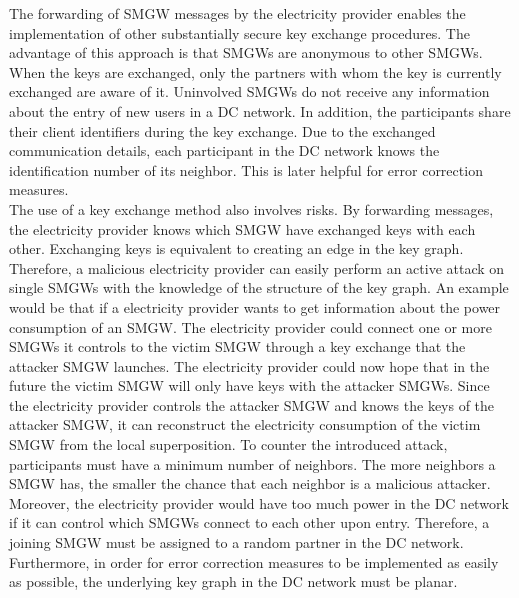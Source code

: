 The forwarding of SMGW messages by the electricity provider enables the implementation of other substantially secure key exchange procedures. The advantage of this approach is that SMGWs are anonymous to other SMGWs. When the keys are exchanged, only the partners with whom the key is currently exchanged are aware of it. Uninvolved SMGWs do not receive any information about the entry of new users in a DC network. In addition, the participants share their client identifiers during the key exchange. Due to the exchanged communication details, each participant in the DC network knows the identification number of its neighbor. This is later helpful for error correction measures. %
\\The use of a key exchange method also involves risks. By forwarding messages, the electricity provider knows which SMGW have exchanged keys with each other. Exchanging keys is equivalent to creating an edge in the key graph.%
Therefore, a malicious electricity provider can easily perform an active attack on single SMGWs with the knowledge of the structure of the key graph.%
An example would be that if a electricity provider wants to get information about the power consumption of an SMGW. The electricity provider could connect one or more SMGWs it controls to the victim SMGW through a key exchange that the attacker SMGW launches. The electricity provider could now hope that in the future the victim SMGW will only have keys with the attacker SMGWs. Since the electricity provider controls the attacker SMGW and knows the keys of the attacker SMGW, it can reconstruct the electricity consumption of the victim SMGW from the local superposition. To counter the introduced attack, participants must have a minimum number of neighbors. The more neighbors a SMGW has, the smaller the chance that each neighbor is a malicious attacker. Moreover, the electricity provider would have too much power in the DC network if it can control which SMGWs connect to each other upon entry. Therefore, a joining SMGW must be assigned to a random partner in the DC network. Furthermore, in order for error correction measures to be implemented as easily as possible, the underlying key graph in the DC network must be planar.\\
